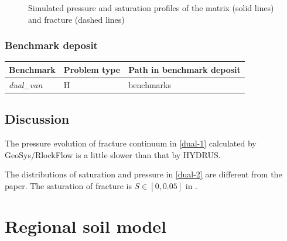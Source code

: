 \begin{figure}[h]
\begin{minipage}[t]{6cm}
\begin{picture}
\end{picture}
\end{minipage}
\caption{Simulated pressure and saturation profiles of the matrix
(solid lines) and fracture (dashed lines)}
\label{us:result-dual-van}
\end{figure}
\subsubsection*{Benchmark deposit}
\begin{tabular}{|l|l|l|}
  \hline
  Benchmark & Problem type & Path in benchmark deposit \\
  \hline
 \emph{dual\_van} & H & benchmarks\verb \h_us\dual\ \\
   \hline
\end{tabular}
%
\subsection{Discussion}
\begin{description}
  \item The pressure evolution of fracture continuum in
  \ref{dual-1} calculated by GeoSys/RlockFlow is a little slower than that by
  HYDRUS.
  \item  The distributions of saturation and pressure in \ref{dual-2}
  are different from the paper. The saturation of
  fracture is $S\in[0,0.05]$ in \cite{Gerke:1993}.
%
\end{description}
%

\section{Regional soil model}
